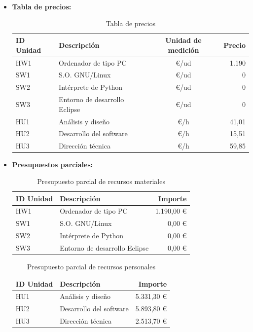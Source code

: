 \begin{itemize}

  \item \textbf{Tabla de precios:}
	\begin{table}[H]
	\begin{center}
	\begin{tabular}{|l|l|c|r|}
		\hline
		\textbf{ID Unidad} & \textbf{Descripción} & \textbf{Unidad de medición} & \textbf{Precio} \\
		\hline
		HW1 & Ordenador de tipo PC & \euro/ud & 1.190 \\
		\hline
		SW1 & S.O. GNU/Linux & \euro/ud & 0 \\
		\hline
		SW2 & Intérprete de Python & \euro/ud & 0 \\
		\hline
		SW3 & Entorno de desarrollo Eclipse & \euro/ud & 0 \\
		\hline
		HU1 & Análisis y diseño & \euro/h & 41,01 \\
		\hline
		HU2 & Desarrollo del software & \euro/h & 15,51 \\
		\hline
		HU3 & Dirección técnica & \euro/h & 59,85 \\
		\hline
	\end{tabular}
	\caption{Tabla de precios}
	\end{center}
	\end{table}

  \item \textbf{Presupuestos parciales:}
	\begin{table}[H]
	 \begin{center}
	  \begin{tabular}{|l|l|r|}
		\hline
		\textbf{ID Unidad} & \textbf{Descripción} & \textbf{Importe} \\
		\hline
		HW1 & Ordenador de tipo PC & 1.190,00 \euro \\
		\hline
		SW1 & S.O. GNU/Linux & 0,00 \euro \\
		\hline
		SW2 & Intérprete de Python & 0,00 \euro \\
		\hline
		SW3 & Entorno de desarrollo Eclipse & 0,00 \euro \\
		\hline
	  \end{tabular}
	  \caption{Presupuesto parcial de recursos materiales}
	 \end{center}
	\end{table}

	\begin{table}[H]
	 \begin{center}
	  \begin{tabular}{|l|l|r|}
		\hline
		\textbf{ID Unidad} & \textbf{Descripción} & \textbf{Importe} \\
		\hline
		HU1 & Análisis y diseño & 5.331,30 \euro \\
		\hline
		HU2 & Desarrollo del software & 5.893,80 \euro \\
		\hline
		HU3 & Dirección técnica & 2.513,70 \euro \\
		\hline
	  \end{tabular}
	  \caption{Presupuesto parcial de recursos personales}
	 \end{center}
	\end{table}	


\end{itemize}
